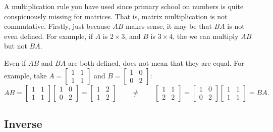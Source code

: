A multiplication rule you have used since primary school on numbers
is quite conspicuously missing for matrices.
That is, matrix multiplication is
not commutative.  Firstly, just because $AB$ makes sense, it may be
that $BA$ is not even defined.  For example, if $A$ is $2 \times 3$, and
$B$ is $3 \times 4$, the we can multiply $AB$ but not $BA$.

Even if $AB$ and $BA$ are both defined, does not mean that they are equal.
For example, take
$A = \left[ \begin{smallmatrix} 1 & 1 \\ 1 & 1 \end{smallmatrix} \right]$
and
$B = \left[ \begin{smallmatrix} 1 & 0 \\ 0 & 2 \end{smallmatrix} \right]$:
\begin{equation*}
AB = 
\begin{bmatrix} 1 & 1 \\ 1 & 1 \end{bmatrix}
\begin{bmatrix} 1 & 0 \\ 0 & 2 \end{bmatrix}
=
\begin{bmatrix} 1 & 2 \\ 1 & 2 \end{bmatrix}
\qquad
\not=
\qquad
\begin{bmatrix} 1 & 1 \\ 2 & 2 \end{bmatrix}
=
\begin{bmatrix} 1 & 0 \\ 0 & 2 \end{bmatrix}
\begin{bmatrix} 1 & 1 \\ 1 & 1 \end{bmatrix}
=
BA .
\end{equation*}

\subsection{Inverse}

